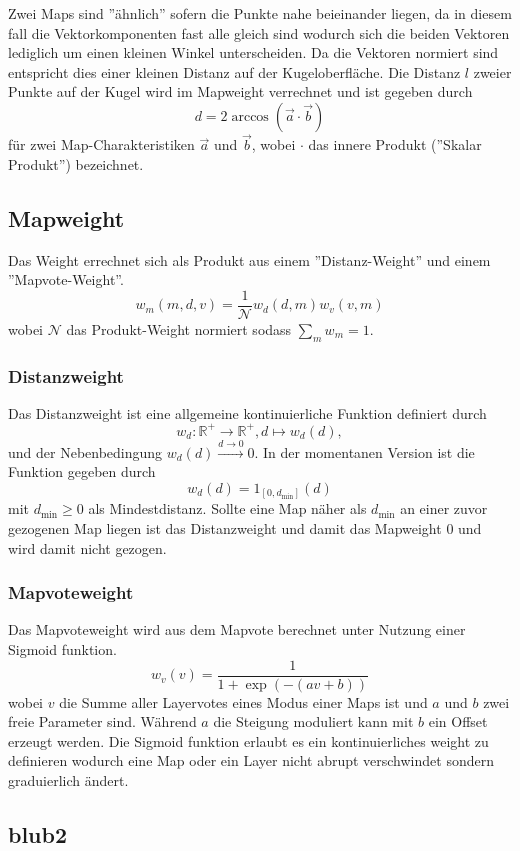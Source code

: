     Zwei Maps sind ''ähnlich'' sofern die Punkte nahe beieinander liegen, da in diesem fall die Vektorkomponenten fast alle gleich sind wodurch sich die beiden Vektoren lediglich um einen kleinen Winkel unterscheiden.
    Da die Vektoren normiert sind entspricht dies einer kleinen Distanz auf der Kugeloberfläche.
    Die Distanz $l$ zweier Punkte auf der Kugel wird im Mapweight verrechnet und ist gegeben durch 
    \begin{equation}
        d = 2\arccos(\vec{a}\cdot\vec{b})
    \end{equation}
    für zwei Map-Charakteristiken $\vec{a}$ und $\vec{b}$, wobei $\cdot$ das innere Produkt (''Skalar Produkt'') bezeichnet. 
    \subsection{Mapweight}
    Das Weight errechnet sich als Produkt aus einem ''Distanz-Weight'' und einem ''Mapvote-Weight''. 
    \begin{equation}
        w_m(m,d,v) = \frac{1}{\mathcal{N}}w_d(d,m)w_v(v,m)
    \end{equation}
    wobei $\mathcal{N}$ das Produkt-Weight normiert sodass $\sum_m w_m = 1$.
    \subsubsection{Distanzweight}
        Das Distanzweight ist eine allgemeine kontinuierliche Funktion definiert durch
        \begin{equation}
            w_d : \mathbb{R}^+ \rightarrow \mathbb{R}^+, d \mapsto w_d(d),
        \end{equation}
        und der Nebenbedingung $w_d(d)\overset{d\rightarrow 0}{\longrightarrow}0$.
        In der momentanen Version ist die Funktion gegeben durch
        \begin{equation}
            w_d(d) = 1_{[0,d_\text{min}]}(d)
        \end{equation}
        mit $d_\text{min}\geq 0$ als Mindestdistanz. 
        Sollte eine Map näher als $d_\text{min}$ an einer zuvor gezogenen Map liegen ist das Distanzweight und damit das Mapweight $0$ und wird damit nicht gezogen. 
    \subsubsection{Mapvoteweight}
        Das Mapvoteweight wird aus dem Mapvote berechnet unter Nutzung einer Sigmoid funktion. 
        \begin{equation}
            w_v(v) = \frac{1}{1+\exp\left(-(av+b)\right)}
        \end{equation}
        wobei $v$ die Summe aller Layervotes eines Modus einer Maps ist und $a$ und $b$ zwei freie Parameter sind.
        Während $a$ die Steigung moduliert kann mit $b$ ein Offset erzeugt werden.
        Die Sigmoid funktion erlaubt es ein kontinuierliches weight zu definieren wodurch eine Map oder ein Layer nicht abrupt verschwindet sondern graduierlich ändert.
    \subsection{blub2}
